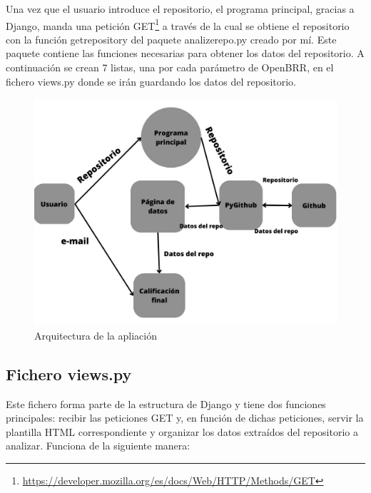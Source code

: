 \documentclass[a4paper, 12pt]{book}
\begin{document}
Una vez que el usuario introduce el repositorio, el programa principal, gracias a Django, manda una petición GET\footnote{\url{https://developer.mozilla.org/es/docs/Web/HTTP/Methods/GET}}  a través de la cual se obtiene el repositorio con la función get\textunderscore repository del paquete analize\textunderscore repo.py creado por mí. Este paquete contiene las funciones necesarias para obtener los datos del repositorio. A continuación se crean 7 listas, una por cada parámetro de OpenBRR, en el fichero views.py donde se irán guardando los datos del repositorio.

\begin{figure}
    \centering
    \includegraphics[bb=0 0 800 600, width=12cm, keepaspectratio]{img/programaprincipal.jpg}
    \caption{Arquitectura de la apliación}\label{fig:arquitectura principal}
\end{figure}

\subsection{Fichero views.py}

Este fichero forma parte de la estructura de Django y tiene dos funciones principales: recibir las peticiones GET y, en función de dichas peticiones, servir la plantilla HTML correspondiente y organizar los datos extraídos del repositorio a analizar. Funciona de la siguiente manera:
\end{document}
